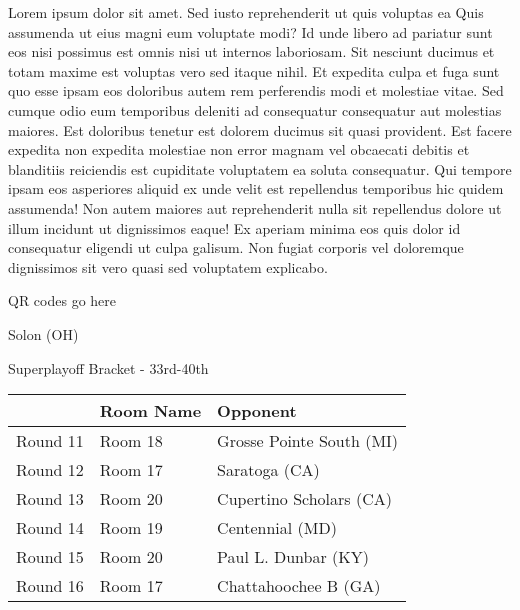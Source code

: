 \documentclass{article}%
\begin{document}
\vspace*{8pt}%
\linebreak%
\newline%
\newline%
    Lorem ipsum dolor sit amet. Sed iusto reprehenderit ut quis voluptas ea Quis assumenda ut eius magni eum voluptate modi? Id unde libero ad pariatur sunt eos nisi possimus est omnis nisi ut internos laboriosam. Sit nesciunt ducimus et totam maxime est voluptas vero sed itaque nihil. Et expedita culpa et fuga sunt quo esse ipsam eos doloribus autem rem perferendis modi et molestiae vitae.\newline%
\newline%
    Sed cumque odio eum temporibus deleniti ad consequatur consequatur aut molestias maiores. Est doloribus tenetur est dolorem ducimus sit quasi provident. Est facere expedita non expedita molestiae non error magnam vel obcaecati debitis et blanditiis reiciendis est cupiditate voluptatem ea soluta consequatur. Qui tempore ipsam eos asperiores aliquid ex unde velit est repellendus temporibus hic quidem assumenda!\newline%
\newline%
    Non autem maiores aut reprehenderit nulla sit repellendus dolore ut illum incidunt ut dignissimos eaque! Ex aperiam minima eos quis dolor id consequatur eligendi ut culpa galisum. Non fugiat corporis vel doloremque dignissimos sit vero quasi sed voluptatem explicabo.\newline%
\newline%
\vspace*{30pt}%
\begin{center}%
\begin{Huge}%
QR codes go here%
\end{Huge}%
\end{center}%
\newpage%
\begin{center}%
\begin{Huge}%
Solon (OH)%
\end{Huge}%
\vspace*{8pt}%
\linebreak%
\begin{Large}%
Superplayoff Bracket {-} 33rd{-}40th%
\end{Large}%
\end{center}%
%
\begin{tabularx}{\textwidth}{|c|Y|Y|}%
\hline%
&Room Name&Opponent\\%
\hline%
Round 11&Room 18&Grosse Pointe South (MI)\\%
Round 12&Room 17&Saratoga (CA)\\%
Round 13&Room 20&Cupertino Scholars (CA)\\%
Round 14&Room 19&Centennial (MD)\\%
Round 15&Room 20&Paul L. Dunbar (KY)\\%
Round 16&Room 17&Chattahoochee B (GA)\\%
\hline%
\end{tabularx}%
\end{document}
